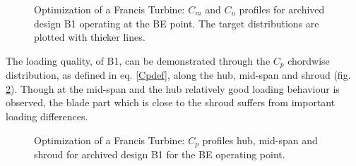 \begin{figure}[h!]
\begin{minipage}[b]{1\linewidth}
 \centering
\end{minipage}
\caption{Optimization of a Francis Turbine: $C_m$ and $C_u$ profiles for archived design B1 operating at the BE point. The target distributions are plotted with thicker lines.}
\label{Francis-B1-OUT}
\end{figure}

The loading quality, of B1, can be demonstrated through the $C_p$ chordwise distribution, as defined in eq. \ref{Cpdef}, along the hub, mid-span and shroud (fig. \ref{Francis-B1-LOAD}). Though at the mid-span and the hub relatively good loading behaviour is observed, the blade part which is close to the shroud suffers from important loading differences.      

\begin{figure}[h!]
\begin{minipage}[b]{1\linewidth}
 \centering
\end{minipage}
\caption{Optimization of a Francis Turbine: $C_p$ profiles hub, mid-span and shroud for archived design B1 for the BE operating point.}
\label{Francis-B1-LOAD}
\end{figure}

